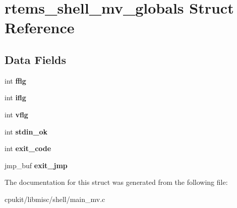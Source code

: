 \hypertarget{structrtems__shell__mv__globals}{}\section{rtems\+\_\+shell\+\_\+mv\+\_\+globals Struct Reference}
\label{structrtems__shell__mv__globals}
\subsection*{Data Fields}
\begin{DoxyCompactItemize}
\item 
\mbox{\label{structrtems__shell__mv__globals_a62eba003d446f145574f3dd12d06fcfb}} 
int {\bfseries fflg}
\item 
\mbox{\label{structrtems__shell__mv__globals_af23001ee772ac361ff30d7d8ac2f24b4}} 
int {\bfseries iflg}
\item 
\mbox{\label{structrtems__shell__mv__globals_a037655a27be48f3d9338eb43ab4e126b}} 
int {\bfseries vflg}
\item 
\mbox{\label{structrtems__shell__mv__globals_a10aa6b486e6ca9771118ea37abc82486}} 
int {\bfseries stdin\+\_\+ok}
\item 
\mbox{\label{structrtems__shell__mv__globals_a1746f9dc7aa4fc7ffd0e801b536ed4b5}} 
int {\bfseries exit\+\_\+code}
\item 
\mbox{\label{structrtems__shell__mv__globals_a5dbc9f0d78bddc271cb5d75d4cdeff5c}} 
jmp\+\_\+buf {\bfseries exit\+\_\+jmp}
\end{DoxyCompactItemize}


The documentation for this struct was generated from the following file\+:\begin{DoxyCompactItemize}
\item 
cpukit/libmisc/shell/main\+\_\+mv.\+c\end{DoxyCompactItemize}
